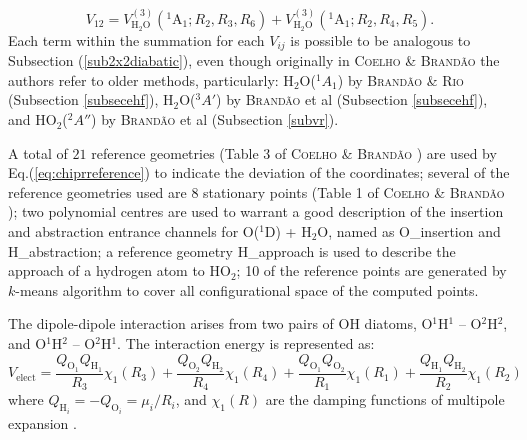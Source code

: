 \documentclass[12pt]{article}
\begin{document}
\begin{equation}
    V_{12} = V_{\text{H}_2\text{O}}^{(3)}(^1\text{A}_1; R_2, R_3, R_6) + V_{\text{H}_2\text{O}}^{(3)}(^1\text{A}_1; R_2, R_4, R_5).
\label{eq3x3v12}
\end{equation}
Each term within the summation for each $V_{ij}$ is possible to be analogous to Subsection (\ref{sub2x2diabatic}), even though originally in \textsc{Coelho \& Brandão} \cite{idx147} the authors refer to older methods, particularly: H$_2$O($^1A_1$) by \textsc{Brandão \& Rio} \cite{idx41} (Subsection \ref{subsecehf}), H$_2$O($^3A'$) by \textsc{Brandão} et al \cite{idx154} (Subsection \ref{subsecehf}), and HO$_2$($^2A''$) by \textsc{Brandão} et al \cite{idx155} (Subsection \ref{subvr}).

A total of $21$ reference geometries (Table 3 of \textsc{Coelho \& Brandão} \cite{idx147}) are used by Eq.(\ref{eq:chiprreference}) to indicate the deviation of the coordinates; several of the reference geometries used are $8$ stationary points (Table 1 of \textsc{Coelho \& Brandão} \cite{idx147}); two polynomial centres are used to warrant a good description of the insertion and abstraction entrance channels for O($^1$D) + H$_2$O, named as O\_insertion and H\_abstraction; a reference geometry H\_approach is used to describe the approach of a hydrogen atom to HO$_2$; 10 of the reference points are generated by $k$-means algorithm to cover all configurational space of the computed points. 

\iffalse
The dipole-dipole interaction arises from two pairs of OH diatoms, O$^1$H$^1$ -- O$^2$H$^2$, and O$^1$H$^2$ -- O$^2$H$^1$. The interaction energy is represented as:
\begin{equation}
    V_{\text{elect}} = \frac{Q_{\text{O}_1}Q_{\text{H}_1}}{R_3}\chi_1(R_3)
    + \frac{Q_{\text{O}_2}Q_{\text{H}_2}}{R_4}\chi_1(R_4)
    + \frac{Q_{\text{O}_1}Q_{\text{O}_2}}{R_1}\chi_1(R_1)
    + \frac{Q_{\text{H}_1}Q_{\text{H}_2}}{R_2}\chi_1(R_2)
\label{eq3x3dipole}
\end{equation}
where $Q_{\text{H}_i} = -Q_{\text{O}_i} = \mu_i/R_i$, and 
$\chi_1(R)$ are the damping functions of multipole expansion \cite{29, 30}.
\end{document}
